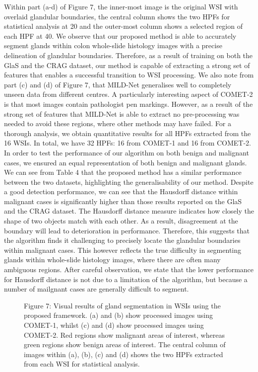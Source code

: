 \documentclass[3p]{elsarticle}
\begin{document}
Within part (a-d) of Figure 7, the inner-most image is the original WSI with overlaid glandular boundaries, the central column shows the two HPFs for statistical analysis at 20 and the outer-most column shows a selected region of each HPF at 40. We observe that our proposed method is able to accurately segment glands within colon whole-slide histology images with a precise delineation of glandular boundaries. Therefore, as a result of training on both the GlaS and the CRAG dataset, our method is capable of extracting a strong set of features that enables a successful transition to WSI processing. We also note from part (c) and (d) of Figure 7, that MILD-Net generalises well to completely unseen data from different centres. A particularly interesting aspect of COMET-2 is that most images contain pathologist pen markings. However, as a result of the strong set of features that MILD-Net is able to extract no pre-processing was needed to avoid these regions, where other methods may have failed. For a thorough analysis, we obtain quantitative results for all HPFs extracted from the 16 WSIs. In total, we have 32 HPFs: 16 from COMET-1 and 16 from COMET-2. In order to test the performance of our algorithm on both benign and malignant cases, we ensured an equal representation of both benign and malignant glands. We can see from Table 4 that the proposed method has a similar performance between the two datasets, highlighting the generalisability of our method. Despite a good detection performance, we can see that the Hausdorff distance within malignant cases is significantly higher than those results reported on the GlaS and the CRAG dataset. The Hausdorff distance measure indicates how closely the shape of two objects match with each other. As a result, disagreement at the boundary will lead to deterioration in performance. Therefore, this suggests that the algorithm finds it challenging to precisely locate the glandular boundaries within malignant cases. This however reflects the true difficulty in segmenting glands within whole-slide histology images, where there are often many ambiguous regions. After careful observation, we state that the lower performance for Hausdorff distance is not due to a limitation of the algorithm, but because a number of mailgnant cases are generally difficult to segment. 
\begin{figure}[h!]
\centering
\captionsetup[subfigure]{labelformat=empty}
\caption*{Figure 7: Visual results of gland segmentation in WSIs using the proposed framework. (a) and (b) show processed images using COMET-1, whilst (c) and (d) show processed images using COMET-2. Red regions show malignant areas of interest, whereas green regions show benign areas of interest. The central column of images within (a), (b), (c) and (d) shows the two HPFs extracted from each WSI for statistical analysis.}
\end{figure}
\end{document}
